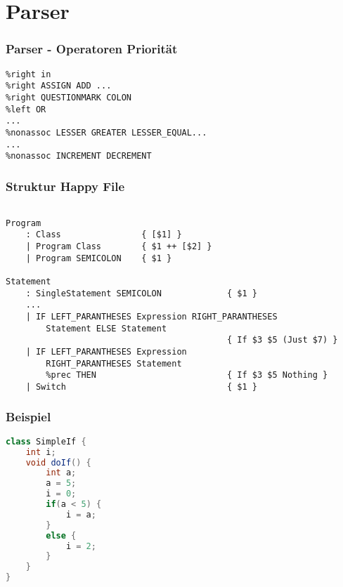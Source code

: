 \section{Parser}

\begin{frame}[fragile]
	\frametitle{Parser - Operatoren Priorität}
	\begin{lstlisting}
%right in
%right ASSIGN ADD ...
%right QUESTIONMARK COLON
%left OR
...
%nonassoc LESSER GREATER LESSER_EQUAL...
...
%nonassoc INCREMENT DECREMENT
	\end{lstlisting}
\end{frame}

\begin{frame}[fragile]
	\frametitle{Struktur Happy File}
	\begin{lstlisting}[basicstyle=\tiny]
		
Program
    : Class                { [$1] }
    | Program Class        { $1 ++ [$2] }
    | Program SEMICOLON    { $1 }

Statement
    : SingleStatement SEMICOLON             { $1 }
	...
    | IF LEFT_PARANTHESES Expression RIGHT_PARANTHESES
        Statement ELSE Statement
                                            { If $3 $5 (Just $7) }
    | IF LEFT_PARANTHESES Expression
        RIGHT_PARANTHESES Statement
        %prec THEN                          { If $3 $5 Nothing }
    | Switch                                { $1 }
	\end{lstlisting}
\end{frame}

\begin{frame}[fragile]
	\frametitle{Beispiel}
	\begin{lstlisting}[language=Java, basicstyle=\tiny]
class SimpleIf {
	int i;
	void doIf() {
		int a;
		a = 5;
		i = 0;
		if(a < 5) {
			i = a;
		}
		else {
			i = 2;
		}
	}
}
	\end{lstlisting}
\end{frame}

